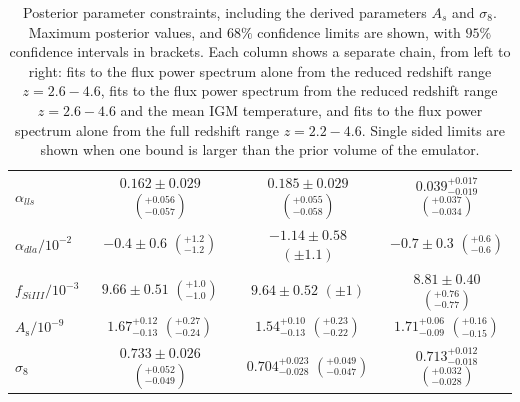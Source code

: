 \begin{table}
\begin{tabular} {| l | c | c | c|}
$\alpha_{lls}   $ & $0.162\pm 0.029   $ $\left(^{+0.056}_{-0.057}\right)$          & $0.185\pm 0.029$  $\left(^{+0.055}_{-0.058}\right)   $     & $0.039^{+0.017}_{-0.019}   $  $\left(^{+0.037}_{-0.034}\right)$   \\
$\alpha_{dla}/10^{-2}   $ & $-0.4\pm 0.6         $ $\left(^{+1.2}_{-1.2}\right)$ & $-1.14\pm 0.58$ $\left(\pm 1.1\right)  $    & $-0.7\pm 0.3         $   $\left(^{+0.6}_{-0.6}\right)$  \\
$f_{SiIII}/10^{-3} $ & $9.66\pm 0.51              $ $\left(^{+1.0}_{-1.0}\right)$              & $9.64\pm 0.52        $       $\left(\pm 1\right) $          & $8.81\pm 0.40        $  $\left(^{+0.76}_{-0.77}\right)$\\
\hline
$A_\mathrm{s}/10^{-9}      $ & $1.67^{+0.12}_{-0.13}$ $\left(^{+0.27}_{-0.24}\right)$ & $1.54^{+0.10}_{-0.13}$ $\left(^{+0.23}_{-0.22}\right)$  & $1.71^{+0.06}_{-0.09}$ $\left(^{+0.16}_{-0.15}\right)$   \\
$\sigma_8$ & $0.733\pm 0.026            $ $\left(^{+0.052}_{-0.049}\right)$ &  $0.704^{+0.023}_{-0.028}   $ $\left(^{+0.049}_{-0.047}\right)$ & $0.713^{+0.012}_{-0.018}$  $\left(^{+0.032}_{-0.028}\right)$  \\
\hline
\end{tabular}
\caption{\label{table:parameters}
Posterior parameter constraints, including the derived parameters $A_s$ and $\sigma_8$.
Maximum posterior values, and $68\%$ confidence limits are shown, with $95\%$ confidence intervals in brackets.
Each column shows a separate chain, from left to right: fits to the flux power spectrum alone from the reduced redshift range $z=2.6 - 4.6$, fits to the flux power spectrum from the reduced redshift range $z=2.6 - 4.6$ and the mean IGM temperature, and fits to the flux power spectrum alone from the full redshift range $z=2.2 - 4.6$.
Single sided limits are shown when one bound is larger than the prior volume of the emulator.
}
\end{table}


